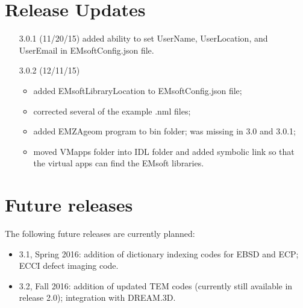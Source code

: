 \documentclass[DIV=calc, paper=letter, fontsize=11pt]{scrartcl}	 %
\begin{document}
\newpage
\section{Release Updates}
\begin{itemize}
	\item[3.0.1] (11/20/15) added ability to set UserName, UserLocation, and UserEmail in \textsf{EMsoftConfig.json} file.
	\item[3.0.2] (12/11/15) \begin{itemize}
		\item added EMsoftLibraryLocation to \textsf{EMsoftConfig.json} file;
		\item corrected several of the example .nml files;
		\item added EMZAgeom program to bin folder; was missing in 3.0 and 3.0.1;
		\item moved VMapps folder into IDL folder and added symbolic link so that the virtual apps can find the EMsoft libraries.
	\end{itemize}
\end{itemize}

\section{Future releases}
The following future releases are currently planned:
\begin{itemize}
	\item 3.1, Spring 2016: addition of dictionary indexing codes for EBSD and ECP; ECCI defect imaging code.
	\item 3.2, Fall 2016: addition of updated TEM codes (currently still available in release 2.0); integration with DREAM.3D.
\end{itemize}
\end{document}
